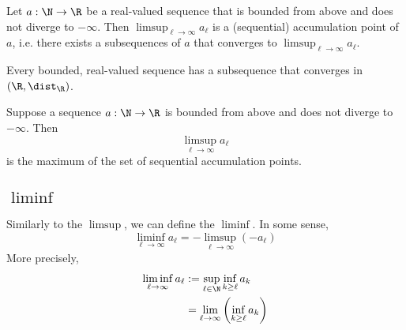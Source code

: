 \begin{theorem}
    \label{thm:8.4.3}
    Let $a: \N \to \R$ be a real-valued sequence that is bounded from above and does not diverge to $-\infty$. Then
    $\limsup_{\ell \to \infty}a_\ell$ is a (sequential) accumulation point of $a$, i.e. there exists a subsequences of $a$ that converges to $\limsup_{\ell \to \infty}a_\ell$.
\end{theorem}

\begin{corollary}
    Every bounded, real-valued sequence has a subsequence that converges in $(\R, \dist_\R)$.
\end{corollary}

\begin{theorem}
    Suppose a sequence $a: \N \to \R$ is bounded from above and does not diverge to $-\infty$. Then
    $$\limsup_{\ell\to\infty}a_\ell$$
    is the maximum of the set of sequential accumulation points.
\end{theorem}

\subsection{\texorpdfstring{$\liminf$}{liminf}}
Similarly to the $\limsup$, we can define the $\liminf$. In some sense,
$$\liminf_{\ell\to\infty}a_\ell = -\limsup_{\ell\to\infty}(-a_\ell)$$
More precisely, 
\begin{align*}
    \liminf_{\ell\to\infty}a_\ell &:= \sup_{\ell\in\N}\inf_{k \ge \ell}a_k\\
                                  &=\lim_{\ell\to\infty}\left(\inf_{k\ge\ell}a_k\right)
\end{align*}

